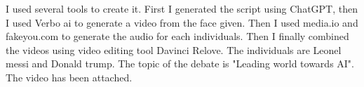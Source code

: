 I used several tools to create it. First I generated the script using ChatGPT, then I used Verbo ai to generate a video from the face given. Then I used media.io and fakeyou.com to generate the audio for each individuals. Then I finally combined the videos using video editing tool Davinci Relove. The individuals are Leonel messi and Donald trump. The topic of the debate is "Leading world towards AI". The video has been attached.

\newpage